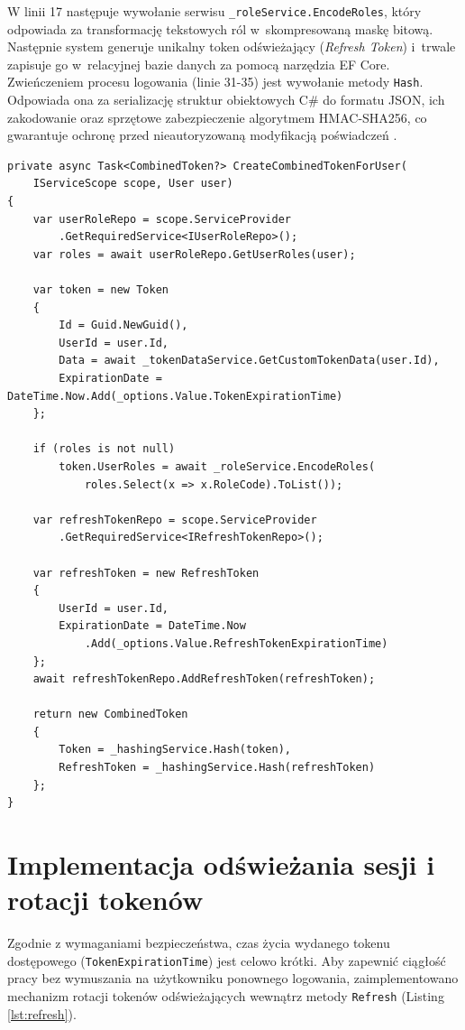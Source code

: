 \documentclass{SGGW-thesis}
\begin{document}
W linii 17 następuje wywołanie serwisu \texttt{\_roleService.EncodeRoles}, który odpowiada za transformację tekstowych ról w~skompresowaną maskę bitową. Następnie system generuje unikalny token odświeżający (\textit{Refresh Token}) i~trwale zapisuje go w~relacyjnej bazie danych za pomocą narzędzia EF Core. Zwieńczeniem procesu logowania (linie 31-35) jest wywołanie metody \texttt{Hash}. Odpowiada ona za serializację struktur obiektowych C\# do formatu JSON, ich zakodowanie oraz sprzętowe zabezpieczenie algorytmem HMAC-SHA256, co gwarantuje ochronę przed nieautoryzowaną modyfikacją poświadczeń \cite{stallings2017}.

\clearpage
\begin{lstlisting}[caption={Budowa, kompresja bitowa i generowanie tokenów kryptograficznych}, label={lst:create_token}]    
private async Task<CombinedToken?> CreateCombinedTokenForUser(
    IServiceScope scope, User user)
{
    var userRoleRepo = scope.ServiceProvider
        .GetRequiredService<IUserRoleRepo>();
    var roles = await userRoleRepo.GetUserRoles(user);

    var token = new Token
    {
        Id = Guid.NewGuid(),
        UserId = user.Id,
        Data = await _tokenDataService.GetCustomTokenData(user.Id),
        ExpirationDate = DateTime.Now.Add(_options.Value.TokenExpirationTime)
    };

    if (roles is not null)
        token.UserRoles = await _roleService.EncodeRoles(
            roles.Select(x => x.RoleCode).ToList());

    var refreshTokenRepo = scope.ServiceProvider
        .GetRequiredService<IRefreshTokenRepo>();

    var refreshToken = new RefreshToken
    {
        UserId = user.Id,
        ExpirationDate = DateTime.Now
            .Add(_options.Value.RefreshTokenExpirationTime)
    };
    await refreshTokenRepo.AddRefreshToken(refreshToken);

    return new CombinedToken
    {
        Token = _hashingService.Hash(token),
        RefreshToken = _hashingService.Hash(refreshToken)
    };
}
\end{lstlisting}

\section{Implementacja odświeżania sesji i rotacji tokenów}

Zgodnie z wymaganiami bezpieczeństwa, czas życia wydanego tokenu dostępowego \linebreak(\texttt{TokenExpirationTime}) jest celowo krótki. Aby zapewnić ciągłość pracy bez wymuszania na użytkowniku ponownego logowania, zaimplementowano mechanizm rotacji tokenów odświeżających wewnątrz metody \texttt{Refresh} (Listing \ref{lst:refresh}). 
\end{document}
